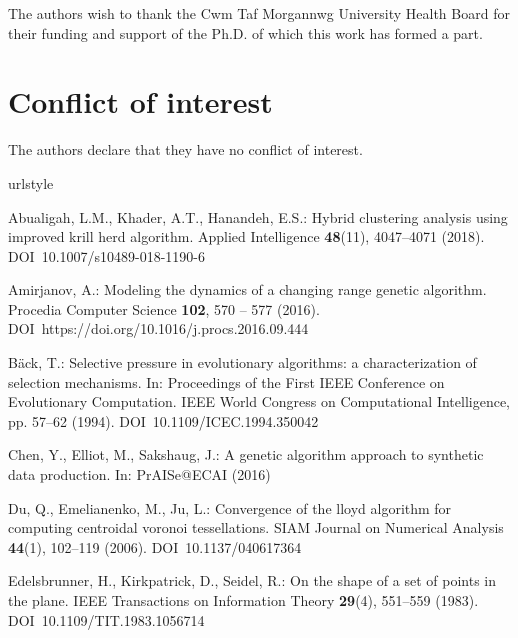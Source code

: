 \documentclass[smallextended]{svjour3}
\begin{document}

\begin{acknowledgements}
    The authors wish to thank the Cwm Taf Morgannwg University Health Board for
    their funding and support of the Ph.D. of which this work has formed a part.

\end{acknowledgements}

\section*{Conflict of interest}

The authors declare that they have no conflict of interest.

\begin{thebibliography}{10}
\providecommand{\url}[1]{{#1}}
\providecommand{\urlprefix}{URL }
\expandafter\ifx\csname urlstyle\endcsname\relax
  \providecommand{\doi}[1]{DOI~\discretionary{}{}{}#1}\else
  \providecommand{\doi}{DOI~\discretionary{}{}{}\begingroup
  \urlstyle{rm}\Url}\fi

Abualigah, L.M., Khader, A.T., Hanandeh, E.S.: Hybrid clustering analysis using
improved krill herd algorithm.
\newblock Applied Intelligence \textbf{48}(11), 4047--4071 (2018).
\newblock \doi{10.1007/s10489-018-1190-6}

Amirjanov, A.: Modeling the dynamics of a changing range genetic algorithm.
\newblock Procedia Computer Science \textbf{102}, 570 -- 577 (2016).
\newblock \doi{https://doi.org/10.1016/j.procs.2016.09.444}

B{\"a}ck, T.: Selective pressure in evolutionary algorithms: a characterization
  of selection mechanisms.
\newblock In: Proceedings of the First IEEE Conference on Evolutionary
  Computation. IEEE World Congress on Computational Intelligence, pp. 57--62
  (1994).
\newblock \doi{10.1109/ICEC.1994.350042}

Chen, Y., Elliot, M., Sakshaug, J.: A genetic algorithm approach to synthetic
  data production.
\newblock In: PrAISe@ECAI (2016)

Du, Q., Emelianenko, M., Ju, L.: Convergence of the lloyd algorithm for
  computing centroidal voronoi tessellations.
\newblock SIAM Journal on Numerical Analysis \textbf{44}(1), 102--119 (2006).
\newblock \doi{10.1137/040617364}

Edelsbrunner, H., Kirkpatrick, D., Seidel, R.: On the shape of a set of points
  in the plane.
\newblock IEEE Transactions on Information Theory \textbf{29}(4), 551--559
  (1983).
\newblock \doi{10.1109/TIT.1983.1056714}


\end{thebibliography}
\end{document}
